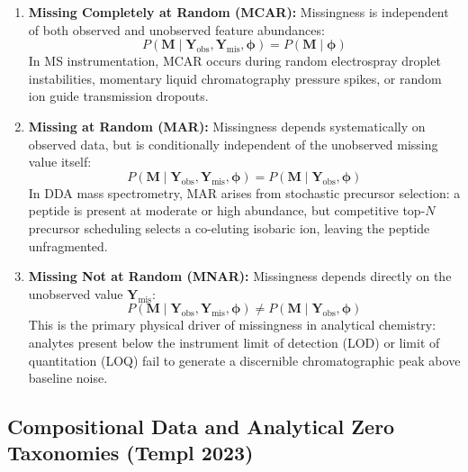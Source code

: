 \documentclass[11pt,oneside]{book}
\begin{document}
\begin{enumerate}
    \item \textbf{Missing Completely at Random (MCAR):} Missingness is independent of both observed and unobserved feature abundances:
    \begin{equation}
    P(\mathbf{M} \mid \mathbf{Y}_{\text{obs}}, \mathbf{Y}_{\text{mis}}, \boldsymbol{\phi}) = P(\mathbf{M} \mid \boldsymbol{\phi})
    \end{equation}
    In MS instrumentation, MCAR occurs during random electrospray droplet instabilities, momentary liquid chromatography pressure spikes, or random ion guide transmission dropouts.
    
    \item \textbf{Missing at Random (MAR):} Missingness depends systematically on observed data, but is conditionally independent of the unobserved missing value itself:
    \begin{equation}
    P(\mathbf{M} \mid \mathbf{Y}_{\text{obs}}, \mathbf{Y}_{\text{mis}}, \boldsymbol{\phi}) = P(\mathbf{M} \mid \mathbf{Y}_{\text{obs}}, \boldsymbol{\phi})
    \end{equation}
    In DDA mass spectrometry, MAR arises from stochastic precursor selection: a peptide is present at moderate or high abundance, but competitive top-$N$ precursor scheduling selects a co-eluting isobaric ion, leaving the peptide unfragmented.
    
    \item \textbf{Missing Not at Random (MNAR):} Missingness depends directly on the unobserved value $\mathbf{Y}_{\text{mis}}$:
    \begin{equation}
    P(\mathbf{M} \mid \mathbf{Y}_{\text{obs}}, \mathbf{Y}_{\text{mis}}, \boldsymbol{\phi}) \ne P(\mathbf{M} \mid \mathbf{Y}_{\text{obs}}, \boldsymbol{\phi})
    \end{equation}
    This is the primary physical driver of missingness in analytical chemistry: analytes present below the instrument limit of detection (LOD) or limit of quantitation (LOQ) fail to generate a discernible chromatographic peak above baseline noise.
\end{enumerate}

\subsection{Compositional Data and Analytical Zero Taxonomies (Templ 2023)}
\end{document}
